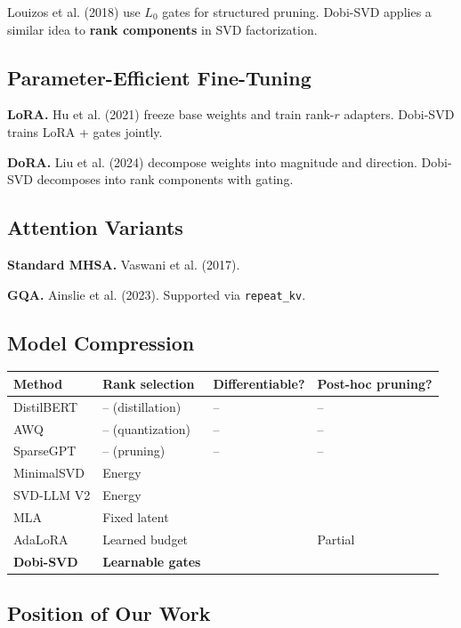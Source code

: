 Louizos et al. (2018) use $L_0$ gates for structured pruning. Dobi-SVD 
applies a similar idea to \textbf{rank components} in SVD factorization.

\subsection{Parameter-Efficient Fine-Tuning}

\textbf{LoRA.} Hu et al. (2021) freeze base weights and train rank-$r$ adapters. 
Dobi-SVD trains LoRA + gates jointly.

\textbf{DoRA.} Liu et al. (2024) decompose weights into magnitude and direction. 
Dobi-SVD decomposes into rank components with gating.

\subsection{Attention Variants}

\textbf{Standard MHSA.} Vaswani et al. (2017).

\textbf{GQA.} Ainslie et al. (2023). Supported via \texttt{repeat\_kv}.

\subsection{Model Compression}

\begin{table}[H]
\centering
\small
\begin{tabular}{llll}
\toprule
\textbf{Method} & \textbf{Rank selection} & \textbf{Differentiable?} & \textbf{Post-hoc pruning?} \\
\midrule
DistilBERT & -- (distillation) & -- & -- \\
AWQ & -- (quantization) & -- & -- \\
SparseGPT & -- (pruning) & -- & -- \\
MinimalSVD & Energy &  &  \\
SVD-LLM V2 & Energy &  &  \\
MLA & Fixed latent &  &  \\
AdaLoRA & Learned budget &  & Partial \\
\textbf{Dobi-SVD} & \textbf{Learnable gates} & \textbf{ } & \textbf{ } \\
\bottomrule
\end{tabular}
\end{table}

\subsection{Position of Our Work}

